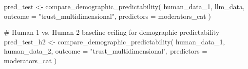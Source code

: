 \documentclass[
  letterpaper,
  DIV=11,
  numbers=noendperiod]{scrartcl}
\newenvironment{Shaded}{\begin{snugshade}}{\end{snugshade}}
\newcommand{\AttributeTok}[1]{\textcolor[rgb]{0.40,0.45,0.13}{#1}}
\newcommand{\CommentTok}[1]{\textcolor[rgb]{0.37,0.37,0.37}{#1}}
\newcommand{\DecValTok}[1]{\textcolor[rgb]{0.68,0.00,0.00}{#1}}
\newcommand{\FunctionTok}[1]{\textcolor[rgb]{0.28,0.35,0.67}{#1}}
\newcommand{\NormalTok}[1]{\textcolor[rgb]{0.00,0.23,0.31}{#1}}
\newcommand{\OtherTok}[1]{\textcolor[rgb]{0.00,0.23,0.31}{#1}}
\newcommand{\SpecialCharTok}[1]{\textcolor[rgb]{0.37,0.37,0.37}{#1}}
\newcommand{\StringTok}[1]{\textcolor[rgb]{0.13,0.47,0.30}{#1}}
\begin{document}
\begin{Shaded}
\begin{Highlighting}[]
\NormalTok{pred\_test }\OtherTok{\textless{}{-}} \FunctionTok{compare\_demographic\_predictability}\NormalTok{(}
\NormalTok{  human\_data\_1, llm\_data,}
  \AttributeTok{outcome    =} \StringTok{"trust\_multidimensional"}\NormalTok{,}
  \AttributeTok{predictors =}\NormalTok{ moderators\_cat}
\NormalTok{)}

\CommentTok{\# Human 1 vs. Human 2 baseline ceiling for demographic predictability}
\NormalTok{pred\_test\_h2 }\OtherTok{\textless{}{-}} \FunctionTok{compare\_demographic\_predictability}\NormalTok{(}
\NormalTok{  human\_data\_1, human\_data\_2,}
  \AttributeTok{outcome    =} \StringTok{"trust\_multidimensional"}\NormalTok{,}
  \AttributeTok{predictors =}\NormalTok{ moderators\_cat}
\NormalTok{)}
\end{Highlighting}
\end{Shaded}

\begin{Shaded}
\end{Shaded}
\end{document}
